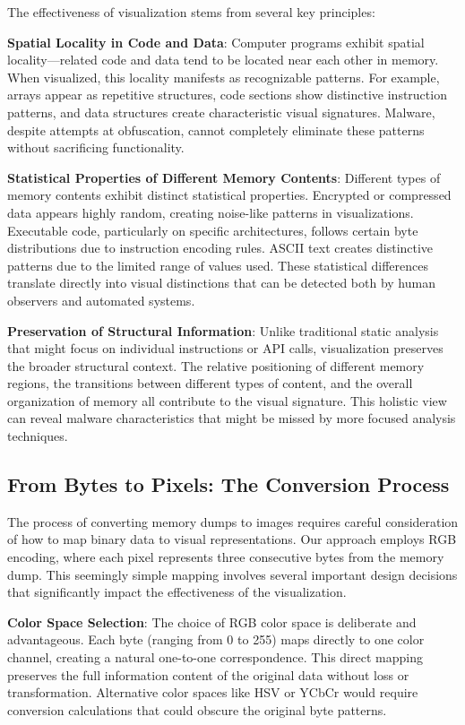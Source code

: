 The effectiveness of visualization stems from several key principles:

\textbf{Spatial Locality in Code and Data}: Computer programs exhibit spatial locality—related code and data tend to be located near each other in memory. When visualized, this locality manifests as recognizable patterns. For example, arrays appear as repetitive structures, code sections show distinctive instruction patterns, and data structures create characteristic visual signatures. Malware, despite attempts at obfuscation, cannot completely eliminate these patterns without sacrificing functionality.

\textbf{Statistical Properties of Different Memory Contents}: Different types of memory contents exhibit distinct statistical properties. Encrypted or compressed data appears highly random, creating noise-like patterns in visualizations. Executable code, particularly on specific architectures, follows certain byte distributions due to instruction encoding rules. ASCII text creates distinctive patterns due to the limited range of values used. These statistical differences translate directly into visual distinctions that can be detected both by human observers and automated systems.

\textbf{Preservation of Structural Information}: Unlike traditional static analysis that might focus on individual instructions or API calls, visualization preserves the broader structural context. The relative positioning of different memory regions, the transitions between different types of content, and the overall organization of memory all contribute to the visual signature. This holistic view can reveal malware characteristics that might be missed by more focused analysis techniques.

\subsection{From Bytes to Pixels: The Conversion Process}
\label{subsec:byte_to_pixel}

The process of converting memory dumps to images requires careful consideration of how to map binary data to visual representations. Our approach employs RGB encoding, where each pixel represents three consecutive bytes from the memory dump. This seemingly simple mapping involves several important design decisions that significantly impact the effectiveness of the visualization.

\textbf{Color Space Selection}: The choice of RGB color space is deliberate and advantageous. Each byte (ranging from 0 to 255) maps directly to one color channel, creating a natural one-to-one correspondence. This direct mapping preserves the full information content of the original data without loss or transformation. Alternative color spaces like HSV or YCbCr would require conversion calculations that could obscure the original byte patterns.

